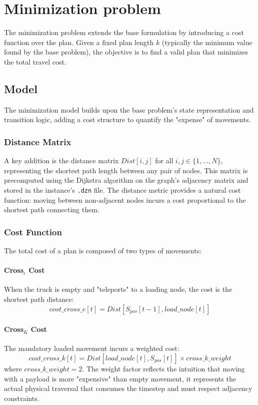 \documentclass[a4paper,12pt]{article}
\begin{document}
\section{Minimization problem}

The minimization problem extends the base formulation by introducing a cost function over the plan. Given a fixed plan length $k$ (typically the minimum value found by the base problem), the objective is to find a valid plan that minimizes the total travel cost.

\subsection{Model}

The minimization model builds upon the base problem's state representation and transition logic, adding a cost structure to quantify the "expense" of movements.

\subsubsection{Distance Matrix}

A key addition is the distance matrix $Dist[i, j]$ for all $i, j \in \{1, \ldots, N\}$, representing the shortest path length between any pair of nodes. This matrix is precomputed using the Dijkstra algorithm on the graph's adjacency matrix and stored in the instance's \texttt{.dzn} file. The distance metric provides a natural cost function: moving between non-adjacent nodes incurs a cost proportional to the shortest path connecting them.

\subsubsection{Cost Function}

The total cost of a plan is composed of two types of movements:

\paragraph{Cross$_\epsilon$ Cost} When the truck is empty and "teleports" to a loading node, the cost is the shortest path distance:
$$cost\_cross\_e[t] = Dist[S_{pos}[t-1], load\_node[t]]$$

\paragraph{Cross$_K$ Cost} The mandatory loaded movement incurs a weighted cost:
$$cost\_cross\_k[t] = Dist[load\_node[t], S_{pos}[t]] \times cross\_k\_weight$$
where $cross\_k\_weight = 2$. The weight factor reflects the intuition that moving with a payload is more "expensive" than empty movement, it represents the actual physical traversal that consumes the timestep and must respect adjacency constraints.
\end{document}
